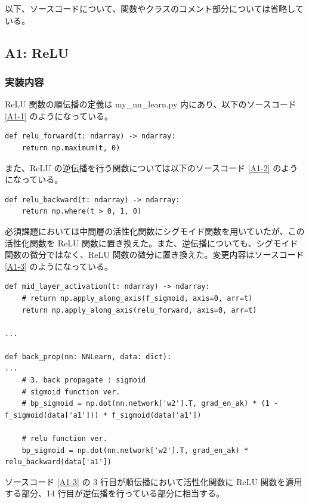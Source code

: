 \documentclass[a4paper,dvipdfmx]{jsarticle}
\begin{document}
以下、ソースコードについて、関数やクラスのコメント部分については省略している。

\subsection*{A1: ReLU}

\subsubsection*{実装内容}

ReLU 関数の順伝播の定義は my\_nn\_learn.py 内にあり、以下のソースコード \ref{A1-1} のようになっている。

\begin{lstlisting}[caption="ReLU 関数(順伝播)",label=A1-1]
def relu_forward(t: ndarray) -> ndarray:
    return np.maximum(t, 0)
\end{lstlisting}

また、ReLU の逆伝播を行う関数については以下のソースコード \ref{A1-2} のようになっている。

\begin{lstlisting}[caption="ReLU 関数(逆伝播)",label=A1-2]
def relu_backward(t: ndarray) -> ndarray:
    return np.where(t > 0, 1, 0)
\end{lstlisting}

必須課題においては中間層の活性化関数にシグモイド関数を用いていたが、この活性化関数を ReLU 関数に置き換えた。また、逆伝播についても、シグモイド関数の微分ではなく、ReLU 関数の微分に置き換えた。変更内容はソースコード \ref{A1-3} のようになっている。

\begin{lstlisting}[caption="中間層の変更内容",label=A1-3]
def mid_layer_activation(t: ndarray) -> ndarray:
    # return np.apply_along_axis(f_sigmoid, axis=0, arr=t)
    return np.apply_along_axis(relu_forward, axis=0, arr=t)

...

def back_prop(nn: NNLearn, data: dict):
...
    # 3. back propagate : sigmoid
    # sigmoid function ver.
    # bp_sigmoid = np.dot(nn.network['w2'].T, grad_en_ak) * (1 - f_sigmoid(data['a1'])) * f_sigmoid(data['a1'])

    # relu function ver.
    bp_sigmoid = np.dot(nn.network['w2'].T, grad_en_ak) * relu_backward(data['a1'])
\end{lstlisting}

ソースコード \ref{A1-3} の 3 行目が順伝播において活性化関数に ReLU 関数を適用する部分、14 行目が逆伝播を行っている部分に相当する。
\end{document}
